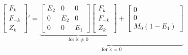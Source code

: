 \begin{equation}\label{eq:woessnerFn}
    \begin{bmatrix}
        F_k      \\
        F_{-k} \\
        Z_k
    \end{bmatrix}' = 
    \underbrace{
    \underbrace{\begin{bmatrix}
        E_2 & 0 & 0 \\
        0 & E_2 & 0 \\
        0 & 0 & E_1 
    \end{bmatrix}
    \begin{bmatrix}
        F_k      \\
        F_{-k} \\
        Z_k
    \end{bmatrix}}_\text{for k $\neq$ 0}
    +
    \begin{bmatrix}
        0 \\
        0 \\
        M_0 (1 - E_1)
    \end{bmatrix}}_\text{for k = 0}
\end{equation}